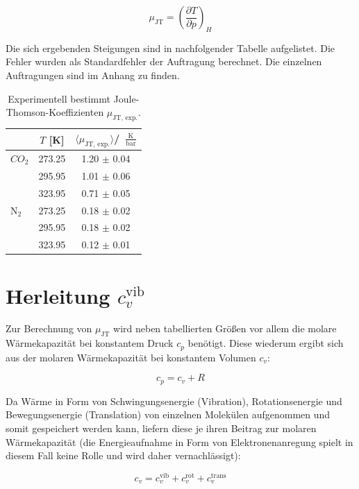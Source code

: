 \documentclass[a4paper,12pt,oneside,onecolum,final,openany]{report}
\begin{document}
\begin{equation}
\mu_\mathrm{JT} = \left(\frac{\partial T}{\partial p}\right)_H
\end{equation}

Die sich ergebenden Steigungen sind in nachfolgender Tabelle aufgelistet. Die Fehler wurden als Standardfehler der Auftragung berechnet. Die einzelnen Auftragungen sind im Anhang zu finden.\\

\begin{table} [h]
\centering
\caption{Experimentell bestimmt Joule-Thomson-Koeffizienten $\mu_{\text{JT, exp.}}$.}
\begin{tabular} {l | c|  c}
	 &  $T$ [K] & $\langle \mu_{\text{JT, exp.}} \rangle$/~$\frac{\mathrm{K}}{\mathrm{bar}}$ \\
	 \hline
	  $CO_\mathrm{2}$ & 273.25 & 1.20 $\pm$ 0.04 \\
	   & 295.95 & 1.01 $\pm$ 0.06\\
	  & 323.95 & 0.71 $\pm$ 0.05\\
	\hline
	$\mathrm{N}_2$ & 273.25 & 0.18  $\pm$  0.02\\
	& 295.95 & 0.18 $\pm$ 0.02\\
	& 323.95& 0.12 $\pm$ 0.01\\
\end{tabular}
\end{table}
\section{Herleitung $c_v^\mathrm{ vib}$}

Zur Berechnung von $\mu_\mathrm{JT}$ wird neben tabellierten Größen vor allem die molare Wärmekapazität bei konstantem Druck $c_p$ benötigt. Diese wiederum ergibt sich aus der molaren Wärmekapazität bei konstantem Volumen $c_v$:

\begin{equation}
c_p = c_v +R \label{cpauscv}
\end{equation}

Da Wärme in Form von Schwingungsenergie (Vibration), Rotationsenergie und Bewegungsenergie (Translation) von einzelnen Molekülen aufgenommen und somit gespeichert werden kann, liefern diese je ihren Beitrag zur molaren Wärmekapazität (die Energieaufnahme in Form von Elektronenanregung spielt in diesem Fall keine Rolle und wird daher vernachlässigt):

\begin{equation}
c_v = c_v^\mathrm{ vib} + c_v^\mathrm{ rot} + c_v^\mathrm{trans}  
\label{cv=rotvibtrans}
\end{equation}
\end{document}
